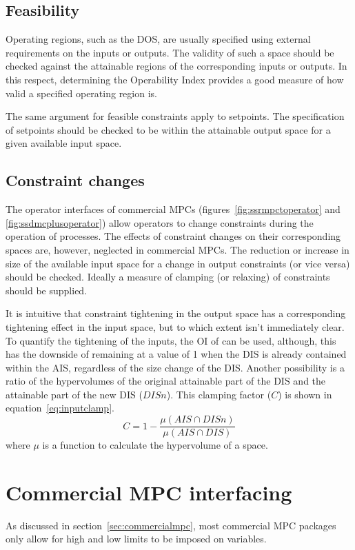 \subsection{Feasibility}
Operating regions, such as the DOS, are usually specified using external requirements on the inputs or outputs.
The validity of such a space should be checked against the attainable regions of the corresponding inputs or outputs.
In this respect, determining the Operability Index provides a good measure of how valid a specified operating region is.

The same argument for feasible constraints apply to setpoints.
The specification of setpoints should be checked to be within the attainable output space for a given available input space.

\subsection{Constraint changes}
The operator interfaces of commercial MPCs (figures~\ref{fig:ssrmpctoperator} and \ref{fig:ssdmcplusoperator}) allow operators to change constraints during the operation of processes.
The effects of constraint changes on their corresponding spaces are, however, neglected in commercial MPCs.
The reduction or increase in size of the available input space for a change in output constraints (or vice versa) should be checked.
Ideally a measure of clamping (or relaxing) of constraints should be supplied.

It is intuitive that constraint tightening in the output space has a corresponding tightening effect in the input space, but to which extent isn't immediately clear.
To quantify the tightening of the inputs, the OI of \citet{vinsonphd} can be used, although, this has the downside of remaining at a value of 1 when the DIS is already contained within the AIS, regardless of the size change of the DIS.
Another possibility is a ratio of the hypervolumes of the original attainable part of the DIS and the attainable part of the new DIS ($DISn$).
This clamping factor ($C$) is shown in equation~\ref{eq:inputclamp}.
\begin{equation}
  \label{eq:inputclamp}
  C = 1-\frac{\mu(AIS \cap DISn)}{\mu(AIS \cap DIS)}
\end{equation}
where $\mu$ is a function to calculate the hypervolume of a space.

\section{Commercial MPC interfacing}
As discussed in section~\ref{sec:commercialmpc}, most commercial MPC packages only allow for high and low limits to be imposed on variables.

